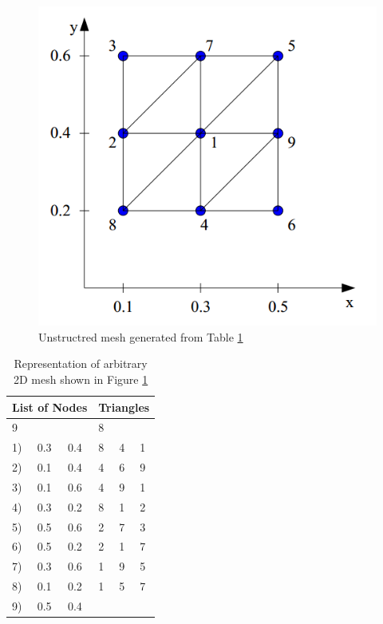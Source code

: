 \documentclass{article}
\begin{document}
\begin{figure}
	\centering
	\includegraphics[scale=0.4]{figures/unstructured-mesh-example.png}
	\caption{Unstructred mesh generated from Table \ref{tab:mesh-representation}}
	\label{fig:mesh-representation}
\end{figure}

\begin{table}
	\centering
	\begin{tabular}{|l|l|l|l|l|l|}
		\hline
		\multicolumn{3}{|c|}{\textbf{List of Nodes}} & \multicolumn{3}{|c|}{\textbf{Triangles}} \\
		\hline
		\multicolumn{3}{|l|}{9} & \multicolumn{3}{|l|}{8} \\		
		\hline
		1) & 0.3 & 0.4 & 8 & 4 & 1 \\
		2) & 0.1 & 0.4 & 4 & 6 & 9 \\
		3) & 0.1 & 0.6 & 4 & 9 & 1 \\
		4) & 0.3 & 0.2 & 8 & 1 & 2 \\
		5) & 0.5 & 0.6 & 2 & 7 & 3 \\
		6) & 0.5 & 0.2 & 2 & 1 & 7 \\
		7) & 0.3 & 0.6 & 1 & 9 & 5 \\
		8) & 0.1 & 0.2 & 1 & 5 & 7 \\
		9) & 0.5 & 0.4 & & & \\
		\hline
	\end{tabular}
	\caption{Representation of arbitrary 2D mesh shown in Figure \ref{fig:mesh-representation}}
	\label{tab:mesh-representation}
\end{table}
\end{document}
